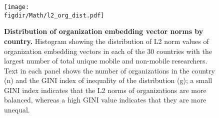 \documentclass[12pt]{article} %
\def\figdir{../Figs}
\begin{document}
%
%
\begin{figure}[h!]
	\centering
	\texttt{[image: \\figdir/Math/l2\_org\_dist.pdf]}
	\caption{
		\textbf{Distribution of organization embedding vector norms by country.}
		Histogram showing the distribution of L2 norm values of organization embedding vectors in each of the 30 countries with the largest number of total unique mobile and non-mobile researchers.
		Text in each panel shows the number of organizations in the country (n) and the GINI index of inequality of the distribution (g);
		a small GINI index indicates that the L2 norms of organizations are more balanced, whereas a high GINI value indicates that they are more unequal.
	}
	\label{fig:norm_dist}
\end{figure}


\clearpage
\printbibliography{}
    
\end{document}
